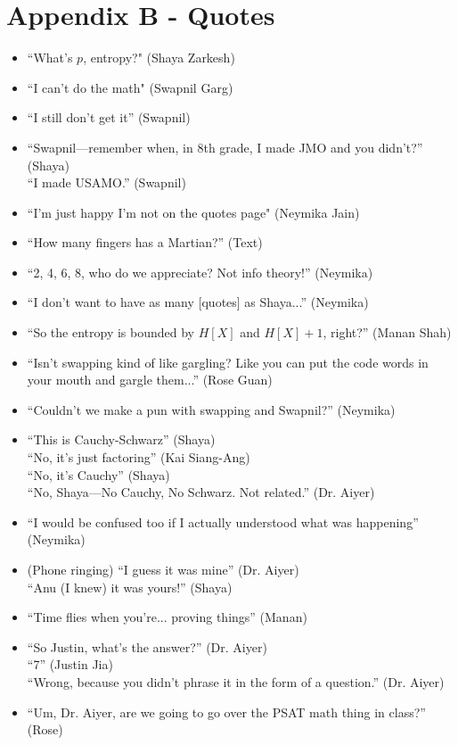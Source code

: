 \documentclass[11pt]{article}
\theoremstyle{definition}
\begin{document}
\section*{Appendix B - Quotes}
\begin{itemize}
\item ``What's $p$, entropy?" (Shaya Zarkesh)
\item ``I can't do the math" (Swapnil Garg)
\item ``I still don't get it'' (Swapnil)
\item ``Swapnil---remember when, in 8th grade, I made JMO and you didn't?'' (Shaya) \\``I made USAMO.'' (Swapnil)
\item ``I'm just happy I'm not on the quotes page" (Neymika Jain)
\item ``How many fingers has a Martian?'' (Text)
\item ``2, 4, 6, 8, who do we appreciate? Not info theory!'' (Neymika)
\item ``I don't want to have as many [quotes] as Shaya...'' (Neymika)
\item ``So the entropy is bounded by $H[X]$ and $H[X] + 1$, right?'' (Manan Shah)
\item ``Isn't swapping kind of like gargling? Like you can put the code words in your mouth and gargle them...'' (Rose Guan)
\item ``Couldn't we make a pun with swapping and Swapnil?'' (Neymika)
\item ``This is Cauchy-Schwarz'' (Shaya) \\``No, it's just factoring'' (Kai Siang-Ang)\\``No, it's Cauchy'' (Shaya)\\``No, Shaya---No Cauchy, No Schwarz. Not related.'' (Dr. Aiyer)
\item ``I would be confused too if I actually understood what was happening'' (Neymika)
\item (Phone ringing) ``I guess it was mine'' (Dr. Aiyer) \\ ``Anu (I knew) it was yours!'' (Shaya)
\item ``Time flies when you're... proving things'' (Manan)
\item ``So Justin, what's the answer?'' (Dr. Aiyer) \\ ``7'' (Justin Jia) \\ ``Wrong, because you didn't phrase it in the form of a question.'' (Dr. Aiyer)
\item ``Um, Dr. Aiyer, are we going to go over the PSAT math thing in class?'' (Rose)

\end{itemize}
\end{document}
